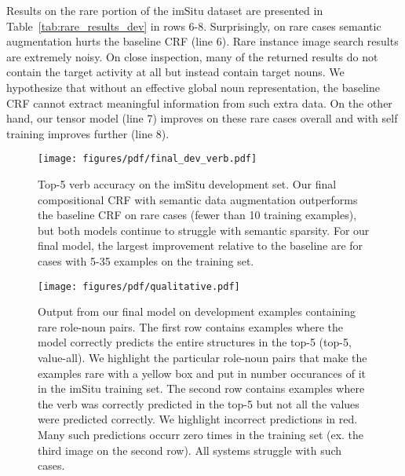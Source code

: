 \documentclass[10pt,twocolumn,letterpaper]{article}
\begin{document}
Results on the rare portion of the imSitu dataset are presented in Table~\ref{tab:rare_results_dev} in rows 6-8. 
Surprisingly, on rare cases semantic augmentation hurts the baseline CRF (line 6). 
Rare instance image search results are extremely noisy. 
On close inspection, many of the returned results do not contain the target activity at all but instead contain target nouns. 
We hypothesize that without an effective global noun representation, the baseline CRF cannot extract meaningful information from such extra data. 
On the other hand, our tensor model (line 7) improves on these rare cases overall and with self training improves further (line 8).


\begin{figure}
\centering
\hspace*{-10pt}
\texttt{[image: figures/pdf/final\_dev\_verb.pdf]}
\caption{\small Top-5 verb accuracy on the imSitu development set. Our final compositional CRF with semantic data augmentation outperforms the baseline CRF on rare cases (fewer than 10 training examples), but both models continue to struggle with semantic sparsity. For our final model, the largest improvement relative to the baseline are for cases with 5-35 examples on the training set.}
\label{fig:summarize_results}
\end{figure}



\begin{figure*}[]
\centering
\texttt{[image: figures/pdf/qualitative.pdf]}
\caption{\small Output from our final model on development examples containing rare role-noun pairs. The first row contains examples where the model correctly predicts the entire structures in the top-5 (top-5, value-all). We highlight the particular role-noun pairs that make the examples rare with a yellow box and put in number occurances of it in the imSitu training set. The second row contains examples where the verb was correctly predicted in the top-5 but not all the values were predicted correctly. We highlight incorrect predictions in red. Many such predictions occurr zero times in the training set (ex. the third image on the second row). All systems struggle with such cases.  
}
\label{fig:qual}
\end{figure*}
\end{document}

